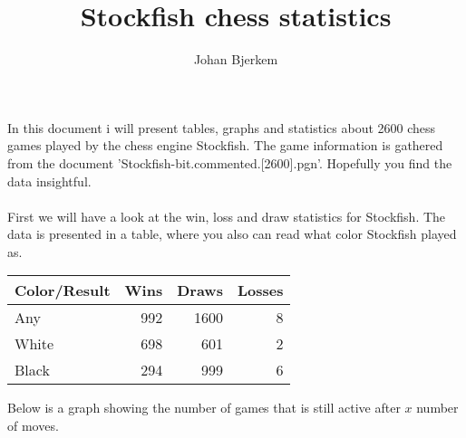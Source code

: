 \documentclass{article}
\title{Stockfish chess statistics}
\author{Johan Bjerkem}
\begin{document}
\maketitle
In this document i will present tables, graphs and statistics about 2600 chess games played by the chess engine Stockfish. The game information is gathered from the document 'Stockfish-bit.commented.[2600].pgn'. Hopefully you find the data insightful.\\\\First we will have a look at the win, loss and draw statistics for Stockfish. The data is presented in a table, where you also can read what color Stockfish played as.
\begin{center}
\begin{tabular}{l|rrr}
Color/Result & Wins & Draws & Losses\\
\hline
Any & 992 & 1600 & 8\\
White & 698 & 601 & 2\\
Black & 294 & 999 & 6\\
\end{tabular}
\end{center}

Below is a graph showing the number of games that is still active after $x$ number of moves.
\end{document}
